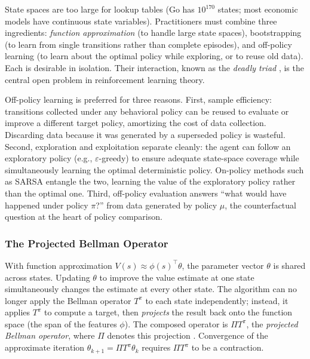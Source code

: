 State spaces are too large for lookup tables (Go has $10^{170}$ states; most economic models have continuous state variables). Practitioners must combine three ingredients: \textit{function approximation} (to handle large state spaces), bootstrapping (to learn from single transitions rather than complete episodes), and off-policy learning (to learn about the optimal policy while exploring, or to reuse old data). Each is desirable in isolation. Their interaction, known as the \emph{deadly triad} \citep[Ch.~11]{sutton2018}, is the central open problem in reinforcement learning theory.

Off-policy learning is preferred for three reasons. First, sample efficiency: transitions collected under any behavioral policy can be reused to evaluate or improve a different target policy, amortizing the cost of data collection. Discarding data because it was generated by a superseded policy is wasteful. Second, exploration and exploitation separate cleanly: the agent can follow an exploratory policy (e.g., $\varepsilon$-greedy) to ensure adequate state-space coverage while simultaneously learning the optimal deterministic policy. On-policy methods such as SARSA entangle the two, learning the value of the exploratory policy rather than the optimal one. Third, off-policy evaluation answers ``what would have happened under policy $\pi$?'' from data generated by policy $\mu$, the counterfactual question at the heart of policy comparison.

\subsubsection{The Projected Bellman Operator}

With function approximation $V(s) \approx \phi(s)^\top \theta$, the parameter vector $\theta$ is shared across states. Updating $\theta$ to improve the value estimate at one state simultaneously changes the estimate at every other state. The algorithm can no longer apply the Bellman operator $T^\pi$ to each state independently; instead, it applies $T^\pi$ to compute a target, then \emph{projects} the result back onto the function space (the span of the features $\phi$). The composed operator is $\Pi T^\pi$, the \textit{projected Bellman operator}, where $\Pi$ denotes this projection \citep{tsitsiklis1997}. Convergence of the approximate iteration $\theta_{k+1} = \Pi T^\pi \theta_k$ requires $\Pi T^\pi$ to be a contraction.

